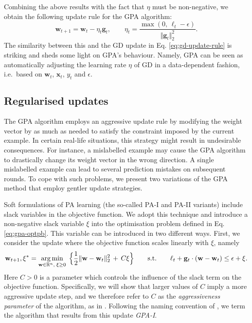 Combining the above results with the fact that $\eta$ must be non-negative, we obtain the following update rule for the GPA algorithm:
\begin{equation}
\label{eq:gpa-update-rule}
	\mathbf{w}_{t+1} = \mathbf{w}_{t} - \eta_t\mathbf{g}_t,
	\qquad \eta_t = \frac{\max(0,\,\ell_t - \epsilon)}{\Vert\mathbf{g}_t\Vert_2^2}.
\end{equation}
The similarity between this and the GD update in Eq. \eqref{eq:gd-update-rule} is striking and sheds some light on GPA's behaviour. Namely, GPA can be seen as automatically adjusting the learning rate $\eta$ of GD in a data-dependent fashion, i.e.\ based on $\mathbf{w}_t$, $\mathbf{x}_t$, $y_t$ and $\epsilon$.

\subsection{Regularised updates}

The GPA algorithm employs an aggressive update rule by modifying the weight vector by as much as needed to satisfy the constraint imposed by the current example. In certain real-life situations, this strategy might result in undesirable consequences. For instance, a mislabelled example may cause the GPA algorithm to drastically change its weight vector in the wrong direction. A single mislabelled example can lead to several prediction mistakes on subsequent rounds. To cope with such problems, we present two variations of the GPA method that employ gentler update strategies.

Soft formulations of PA learning (the so-called PA-I and PA-II variants) include slack variables in the objective function. We adopt this technique and introduce a non-negative slack variable $\xi$ into the optimisation problem defined in Eq. \eqref{eq:gpa-optpb}. This variable can be introduced in two different ways. First, we consider the update where the objective function scales linearly with $\xi$, namely 
\begin{equation}
\label{eq:gpa-optpb-I}
	\mathbf{w}_{t+1}, \xi^*
	= \operatorname*{arg\,min}_{\mathbf{w}\in\mathbb{R}^n, \; \xi \geq 0} \; \Big\{\frac{1}{2}\Vert\mathbf{w} - \mathbf{w}_t\Vert_2^2 \, + \, C\xi\Big\}
	\qquad \text{s.t.} \qquad \ell_t + \mathbf{g}_t\cdot(\mathbf{w} - \mathbf{w}_t) \leq \epsilon + \xi.
\end{equation}
Here $C > 0$ is a parameter which controls the influence of the slack term on the objective function. Specifically, we will show that larger values of $C$ imply a more aggressive update step, and we therefore refer to $C$ as the \emph{aggressiveness parameter} of the algorithm, as in \citep{crammer06}. Following the naming convention of \citet{crammer06}, we term the algorithm that results from this update \emph{GPA-I}.

